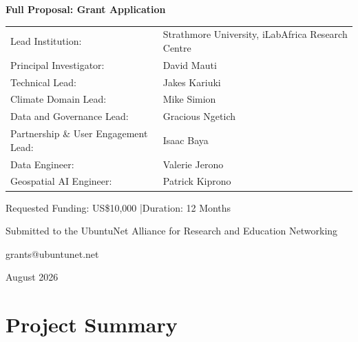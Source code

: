 \documentclass[12pt,a4paper]{article}
\begin{document}
\begin{titlepage}
\vspace{1.3cm}
{\normalsize \textbf{Full Proposal: Grant Application}\par}

\vspace{1.0cm}
{\normalsize
\begin{tabular}{@{}ll@{}}
Lead Institution: & Strathmore University, iLabAfrica Research Centre \\[4pt]
Principal Investigator: & David Mauti \\[4pt]
Technical Lead: & Jakes Kariuki \\[4pt]
Climate Domain Lead: & Mike Simion \\[4pt]
Data and Governance Lead: & Gracious Ngetich \\[4pt]
Partnership \& User Engagement Lead: & Isaac Baya \\[4pt]
Data Engineer: & Valerie Jerono \\[4pt]
Geospatial AI Engineer: & Patrick Kiprono \\[4pt]
\end{tabular}\par}

\vspace{1.1cm}
{\normalsize Requested Funding: US\$10,000 \quad|\quad Duration: 12 Months\par}

\vspace{1.1cm}
{\normalsize Submitted to the UbuntuNet Alliance for Research and Education Networking\par}
{\normalsize grants@ubuntunet.net\par}

\vspace{1.3cm}
{\normalsize August 2026\par}

\end{titlepage}

\section{Project Summary}
\end{document}
